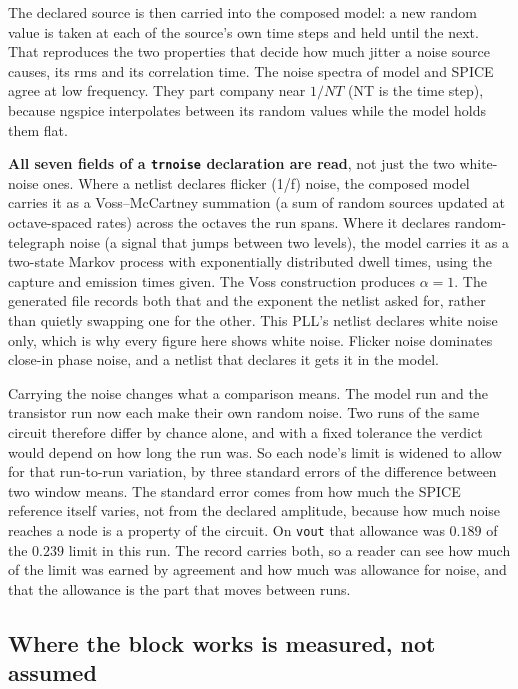 \documentclass[11pt,a4paper]{article}
\begin{document}
The declared source is then carried into the composed model: a new
random value is taken at each of the source's own time steps and held
until the next. That reproduces the two properties that decide how
much jitter a noise source causes, its rms and its correlation time.
The noise spectra of model and SPICE agree at low frequency. They part
company near $1/NT$ (NT is the time step), because ngspice
interpolates between its random values while the model holds them
flat.

\textbf{All seven fields of a \texttt{trnoise} declaration are read},
not just the two white-noise ones. Where a netlist declares flicker
(1/f) noise, the composed model carries it as a Voss--McCartney
summation (a sum of random sources updated at octave-spaced rates)
across the octaves the run spans. Where it declares random-telegraph
noise (a signal that jumps between two levels), the model carries it
as a two-state Markov process with exponentially distributed dwell
times, using the capture and emission times given. The Voss
construction produces $\alpha = 1$. The generated file records both
that and the exponent the netlist asked for, rather than quietly
swapping one for the other. This PLL's netlist declares white noise
only, which is why every figure here shows white noise. Flicker noise
dominates close-in phase noise, and a netlist that declares it gets it
in the model.

Carrying the noise changes what a comparison means. The model run and
the transistor run now each make their own random noise. Two runs of
the same circuit therefore differ by chance alone, and with a fixed
tolerance the verdict would depend on how long the run was. So each
node's limit is widened to allow for that run-to-run variation, by
three standard errors of the difference between two window means. The
standard error comes from how much the SPICE reference itself varies,
not from the declared amplitude, because how much noise reaches a node
is a property of the circuit. On \texttt{vout} that allowance was
$0.189$ of the $0.239$ limit in this run. The record carries both, so
a reader can see how much of the limit was earned by agreement and how
much was allowance for noise, and that the allowance is the part that
moves between runs.

\subsection{Where the block works is measured, not assumed}
\label{sec:whereitworks}
\end{document}
